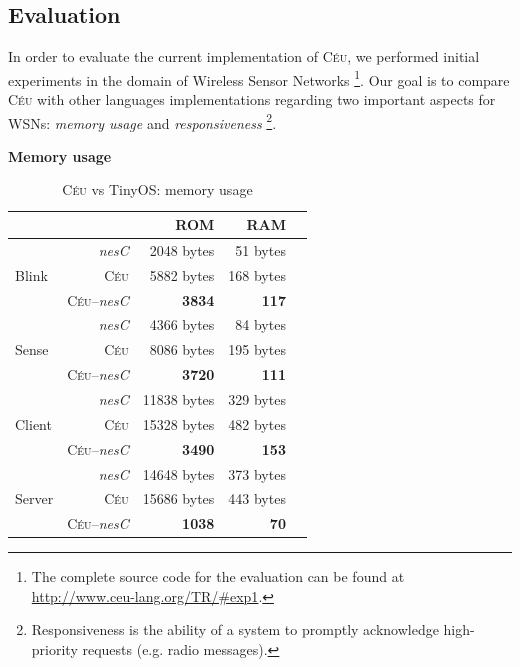\documentclass[11pt,a4paper]{article}
\newcommand{\2}{\;\;}
\newcommand{\5}{\;\;\;\;\;}
\newcommand{\CEU}{\textsc{C\'{e}u}}
\newcommand{\nesc}{\emph{nesC}}
\begin{document}

\subsection{Evaluation}

In order to evaluate the current implementation of \CEU{}, we performed initial
experiments in the domain of Wireless Sensor Networks%
\footnote{The complete source code for the evaluation can be found at \\
\url{http://www.ceu-lang.org/TR/\#exp1}.}.
Our goal is to compare \CEU{} with other languages implementations regarding 
two important aspects for WSNs: \emph{memory usage} and \emph{responsiveness}%
\footnote{Responsiveness is the ability of a system to promptly acknowledge 
high-priority requests (e.g. radio messages).}.

\textbf{Memory usage}

\newcommand{\dif}{{\small \CEU{}--\nesc{}}}
\newcommand{\s}[1]{{\small \textbf{#1}}}


\begin{table}[t]\small
\begin{center}
\begin{tabular}{ | l | r | r | r | r | }
\hline
\multicolumn{2}{|c|}{}
           &          ROM &         RAM \\
\hline\hline
\multirow{3}{*}{Blink}
    & \nesc &  2048 bytes &    51 bytes \\
    & \CEU  &  5882 bytes &   168 bytes \\
    & \dif  &    \s{3834} &     \s{117} \\
\hline\hline
\multirow{3}{*}{Sense}
    & \nesc &  4366 bytes &    84 bytes \\
    & \CEU  &  8086 bytes &   195 bytes \\
    & \dif  &  \s{3720}   &     \s{111} \\
\hline\hline
\multirow{3}{*}{Client}
    & \nesc & 11838 bytes &   329 bytes \\
    & \CEU  & 15328 bytes &   482 bytes \\
    & \dif  &    \s{3490} &     \s{153} \\
\hline\hline
\multirow{3}{*}{Server}
    & \nesc & 14648 bytes &   373 bytes \\
    & \CEU  & 15686 bytes &   443 bytes \\
    & \dif  &    \s{1038} &      \s{70} \\
\hline
\end{tabular}
\end{center}
\caption{\CEU{} vs TinyOS: memory usage}
\label{tab:eval}
\end{table}
\end{document}
